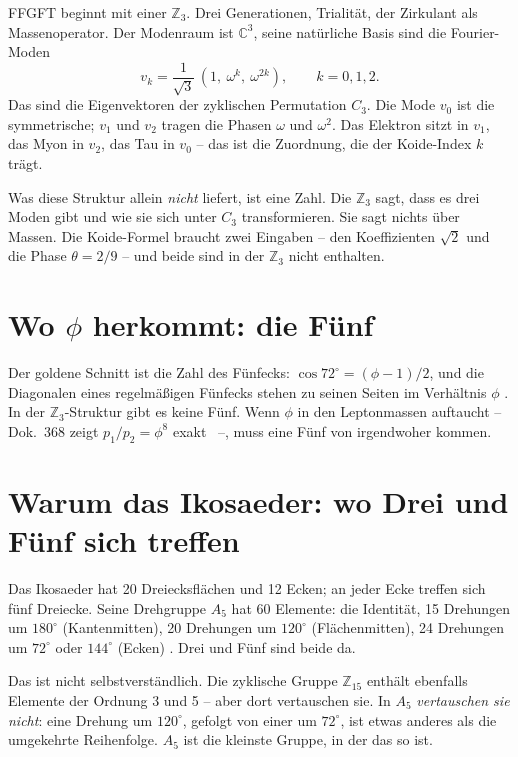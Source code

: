 FFGFT beginnt mit einer $\mathbb{Z}_3$. Drei Generationen, Trialität, der
Zirkulant als Massenoperator. Der Modenraum ist $\mathbb{C}^3$, seine
natürliche Basis sind die Fourier-Moden
\[
  v_k = \frac{1}{\sqrt3}\,(1,\ \omega^k,\ \omega^{2k}), \qquad k = 0,1,2.
\]
Das sind die Eigenvektoren der zyklischen Permutation $C_3$. Die Mode $v_0$ ist
die symmetrische; $v_1$ und $v_2$ tragen die Phasen $\omega$ und $\omega^2$. Das
Elektron sitzt in $v_1$, das Myon in $v_2$, das Tau in $v_0$ -- das ist die
Zuordnung, die der Koide-Index $k$ trägt.

Was diese Struktur allein \emph{nicht} liefert, ist eine Zahl. Die $\mathbb{Z}_3$
sagt, dass es drei Moden gibt und wie sie sich unter $C_3$ transformieren. Sie
sagt nichts über Massen. Die Koide-Formel braucht zwei Eingaben -- den
Koeffizienten $\sqrt2$ und die Phase $\theta = 2/9$ -- und beide sind in der
$\mathbb{Z}_3$ nicht enthalten.

\section{Wo $\phi$ herkommt: die Fünf}

Der goldene Schnitt ist die Zahl des Fünfecks: $\cos 72^\circ = (\phi-1)/2$, und
die Diagonalen eines regelmäßigen Fünfecks stehen zu seinen Seiten im
Verhältnis $\phi$ \EM. In der $\mathbb{Z}_3$-Struktur gibt es keine Fünf. Wenn
$\phi$ in den Leptonmassen auftaucht -- Dok.~368 zeigt $p_1/p_2 = \phi^8$ exakt
\BM~--, muss eine Fünf von irgendwoher kommen.

\section{Warum das Ikosaeder: wo Drei und Fünf sich treffen}

Das Ikosaeder hat 20 Dreiecksflächen und 12 Ecken; an jeder Ecke treffen sich
fünf Dreiecke. Seine Drehgruppe $A_5$ hat 60 Elemente: die Identität, 15
Drehungen um $180^\circ$ (Kantenmitten), 20 Drehungen um $120^\circ$
(Flächenmitten), 24 Drehungen um $72^\circ$ oder $144^\circ$ (Ecken) \EM. Drei
und Fünf sind beide da.

Das ist nicht selbstverständlich. Die zyklische Gruppe $\mathbb{Z}_{15}$ enthält
ebenfalls Elemente der Ordnung 3 und 5 -- aber dort vertauschen sie. In $A_5$
\emph{vertauschen sie nicht}: eine Drehung um $120^\circ$, gefolgt von einer
um $72^\circ$, ist etwas anderes als die umgekehrte Reihenfolge. $A_5$ ist die
kleinste Gruppe, in der das so ist.

